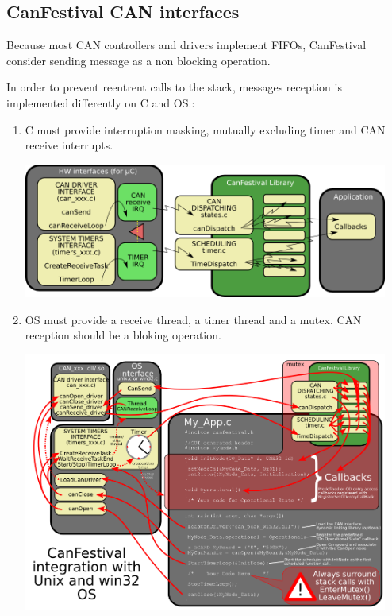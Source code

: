 \documentclass[12pt,english,a4paper]{book}
\begin{document}
\bigskip{}



\subsection{CanFestival CAN interfaces}

Because most CAN controllers and drivers implement FIFOs, CanFestival
consider sending message as a non blocking operation.

In order to prevent reentrent calls to the stack, messages reception
is implemented differently on {\textmu}C and OS.:

\begin{enumerate}
\item {\textmu}C must provide interruption masking, mutually excluding timer and CAN receive interrupts.\\



\begin{center}
\includegraphics[width=12cm]{Pictures/10000201000003CA0000016604E6A5EF} 
\par\end{center}

\item OS must provide a receive thread, a timer thread and a mutex. CAN
reception should be a bloking operation.\\



\begin{center}
\includegraphics[width=12cm]{Pictures/10000201000003F9000002CF8B0CDAEA} 
\par\end{center}

\end{enumerate}
\end{document}

